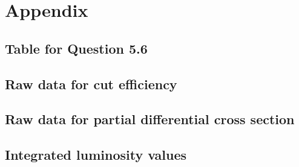 \clearpage
\appendix
\section{Appendix}
\subsection{Table for Question 5.6}
	

\clearpage
\subsection{Raw data for cut efficiency}\label{app:59}


\clearpage
\subsection{Raw data for partial differential cross section}\label{app:510}


\subsection{Integrated luminosity values}

